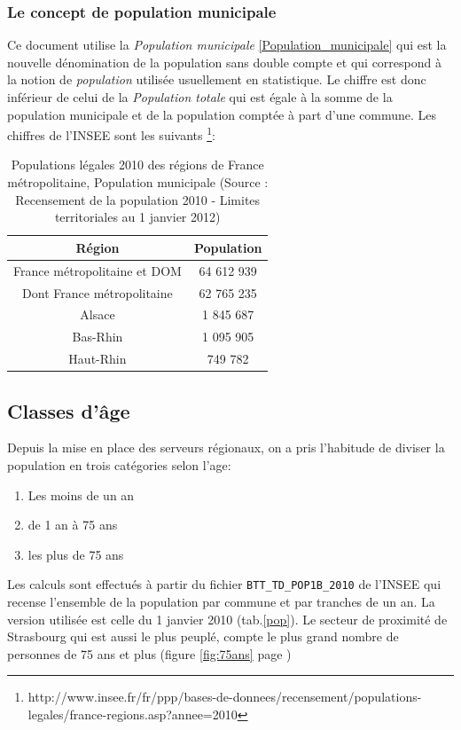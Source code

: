 \documentclass[12pt,english,french,twoside]{book}\usepackage[]{graphicx}\usepackage[]{color}
\providecommand{\tabularnewline}{\\} %
\begin{document}
\subsubsection{Le concept de population municipale}

Ce document utilise la \emph{Population municipale} \ref{Population_municipale}   qui est la nouvelle dénomination de la population sans double compte et qui correspond à la notion de \emph{population} utilisée usuellement en statistique.
Le chiffre est donc inférieur de celui de la \emph{Population totale} qui est égale à la somme de la population municipale et de la population comptée à part d'une commune.
Les chiffres de l'INSEE sont les suivants \footnote{http://www.insee.fr/fr/ppp/bases-de-donnees/recensement/populations-legales/france-regions.asp?annee=2010}:

\begin{table}
\begin{center}
\begin{tabular}{|c|c|}
\hline 
Région & Population\tabularnewline
\hline 
\hline 
France métropolitaine et DOM & 64 612 939\tabularnewline
\hline 
Dont France métropolitaine & 62 765 235\tabularnewline
\hline 
Alsace & 1 845 687\tabularnewline
\hline 
Bas-Rhin & 1 095 905\tabularnewline
\hline 
Haut-Rhin & 749 782\tabularnewline
\hline 
\end{tabular}
\caption[Populations légales 2010]{Populations légales 2010 des régions de France métropolitaine, Population
municipale (Source : Recensement de la population 2010 - Limites territoriales
au 1\ier{} janvier 2012) }
\label{pop2010}
\end{center}
\end{table}

\subsection{Classes d'âge}
Depuis la mise en place des serveurs régionaux, on a pris l'habitude de diviser la population en trois catégories selon l'age:
\begin{enumerate}
  \item Les moins de un an
  \item de 1 an à 75 ans
  \item les plus de 75 ans
\end{enumerate}

Les calculs sont effectués à partir du fichier \texttt{BTT\_TD\_POP1B\_2010} de l'INSEE qui recense l'ensemble de la population par commune et par tranches de un an. La version utilisée est celle du 1\ier{} janvier 2010 (tab.\ref{pop}). Le secteur de proximité de Strasbourg qui est aussi le plus peuplé, compte le plus grand nombre de personnes de 75 ans et plus (figure \ref{fig:75ans} page \pageref{fig:75ans})
\end{document}
